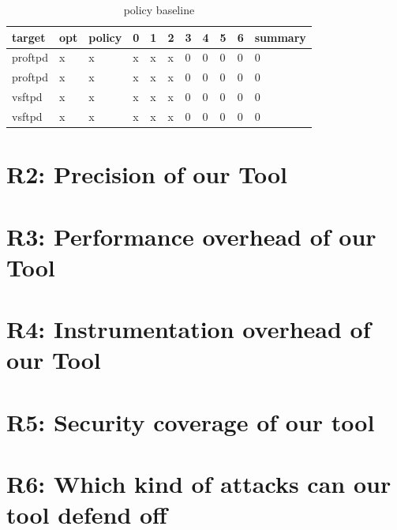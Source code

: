 \begin{table}[H]
\centering
\caption{policy baseline}
\label{matching}
\begin{tabular}{|l|l|l|l|l|l|l|l|l|l|l|} \hline
\textbf{target}  & \textbf{opt}     & \textbf{policy} & \textbf{0}    &\textbf{1} & \textbf{2}  & \textbf{3} &\textbf{4} & \textbf{5} &\textbf{6}  &\textbf{summary} \\ \hline 
proftpd          &x                 &x                &x              &x          &x            &0           &0          &0           &0           &0     \\ \hline
proftpd          &x                 &x                &x              &x          &x            &0           &0          &0           &0           &0      \\ \hline
vsftpd           &x                 &x                &x              &x          &x            &0           &0          &0           &0           &0      \\ \hline
vsftpd           &x                 &x                &x              &x          &x            &0           &0          &0           &0           &0      \\ \hline

\end{tabular}
\end{table}


\section{R2: Precision of our Tool}

\section{R3: Performance overhead of our Tool}

\section{R4: Instrumentation overhead of our Tool}

\section{R5: Security coverage of our tool}

\section{R6: Which kind of attacks can our tool defend off}


